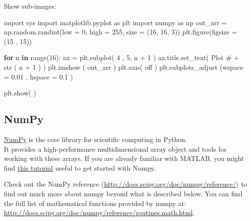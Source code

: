 \documentclass[
]{article}
\newenvironment{Shaded}{}{}
\newcommand{\BuiltInTok}[1]{#1}
\newcommand{\ControlFlowTok}[1]{\textcolor[rgb]{0.00,0.44,0.13}{\textbf{#1}}}
\newcommand{\DecValTok}[1]{\textcolor[rgb]{0.25,0.63,0.44}{#1}}
\newcommand{\FloatTok}[1]{\textcolor[rgb]{0.25,0.63,0.44}{#1}}
\newcommand{\ImportTok}[1]{#1}
\newcommand{\KeywordTok}[1]{\textcolor[rgb]{0.00,0.44,0.13}{\textbf{#1}}}
\newcommand{\NormalTok}[1]{#1}
\newcommand{\OperatorTok}[1]{\textcolor[rgb]{0.40,0.40,0.40}{#1}}
\newcommand{\StringTok}[1]{\textcolor[rgb]{0.25,0.44,0.63}{#1}}
\begin{document}
Show sub-images:

\begin{Shaded}
\begin{Highlighting}[]
\ImportTok{import}\NormalTok{ sys }
\ImportTok{import}\NormalTok{ matplotlib.pyplot }\ImportTok{as}\NormalTok{ plt }
\ImportTok{import}\NormalTok{ numpy }\ImportTok{as}\NormalTok{ np }
\NormalTok{out\_arr }\OperatorTok{=}\NormalTok{ np.random.randint(low }\OperatorTok{=}  \DecValTok{0}\NormalTok{, }
\NormalTok{                            high }\OperatorTok{=} \DecValTok{255}\NormalTok{, }
\NormalTok{                            size }\OperatorTok{=}\NormalTok{ (}\DecValTok{16}\NormalTok{, }\DecValTok{16}\NormalTok{, }\DecValTok{3}\NormalTok{))}
\NormalTok{plt.figure(figsize }\OperatorTok{=}\NormalTok{ (}\DecValTok{15}\NormalTok{ , }\DecValTok{15}\NormalTok{)) }

\ControlFlowTok{for}\NormalTok{ n }\KeywordTok{in} \BuiltInTok{range}\NormalTok{(}\DecValTok{16}\NormalTok{):}
\NormalTok{  ax }\OperatorTok{=}\NormalTok{ plt.subplot( }\DecValTok{4}\NormalTok{ , }\DecValTok{5}\NormalTok{, n }\OperatorTok{+} \DecValTok{1}\NormalTok{ )}
\NormalTok{  ax.title.set\_text( }\StringTok{\textquotesingle{}Plot \#\textquotesingle{}}  \OperatorTok{+}  \BuiltInTok{str}\NormalTok{ ( n }\OperatorTok{+} \DecValTok{1}\NormalTok{ ) )     }
\NormalTok{  plt.imshow ( out\_arr )  }
\NormalTok{  plt.axis( }\StringTok{\textquotesingle{}off\textquotesingle{}}\NormalTok{ ) }
\NormalTok{  plt.subplots\_adjust (wspace }\OperatorTok{=} \FloatTok{0.01}\NormalTok{ , hspace }\OperatorTok{=} \FloatTok{0.1}\NormalTok{ )  }

\NormalTok{plt.show( )}
\end{Highlighting}
\end{Shaded}

\hypertarget{numpy}{%
\subsection{NumPy}\label{numpy}}

\href{http://www.numpy.org/}{NumPy} is the core library for scientific
computing in Python.\\
It provides a high-performance multidimensional array object and tools
for working with these arrays. If you are already familiar with MATLAB,
you might find
\href{https://docs.scipy.org/doc/numpy/user/numpy-for-matlab-users.html}{this
tutorial} useful to get started with Numpy.

Check out the NumPy reference
(\url{http://docs.scipy.org/doc/numpy/reference/}) to find out much more
about numpy beyond what is described below. You can find the full list
of mathematical functions provided by numpy at:
\url{http://docs.scipy.org/doc/numpy/reference/routines.math.html}.
\end{document}
